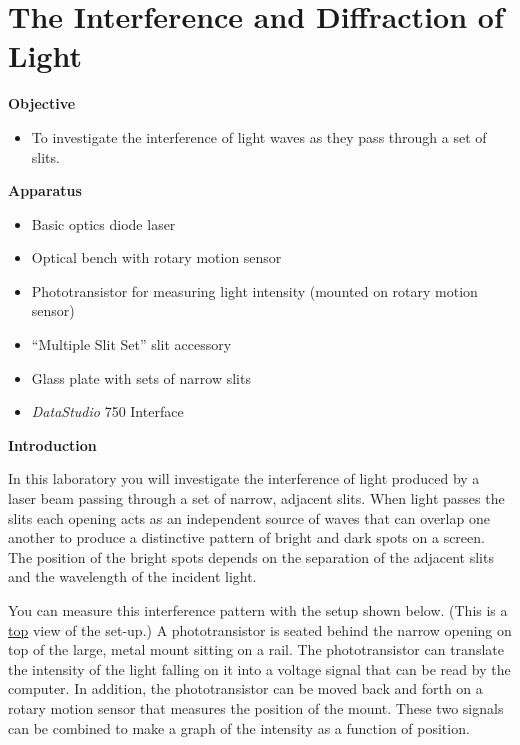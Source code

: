 
\section{The Interference and Diffraction of Light}

\makelabheader %

\textbf{Objective}

\begin{itemize}
\item To investigate the interference of light waves as they pass through
a set of slits. 
\end{itemize}
\textbf{Apparatus}

\begin{itemize}
\item Basic optics diode laser
\item Optical bench with rotary motion sensor
\item Phototransistor for measuring light intensity (mounted on rotary motion sensor)
\item ``Multiple Slit Set'' slit accessory
\item Glass plate with sets of narrow slits
\item {\it DataStudio} 750 Interface
\end{itemize}
\textbf{Introduction}

In this laboratory you will investigate the interference of light
produced by a laser beam passing through a set of narrow, adjacent
slits. When light passes the slits each opening acts as an independent
source of waves that can overlap one another to produce a distinctive
pattern of bright and dark spots on a screen. The position of the
bright spots depends on the separation of the adjacent slits and the
wavelength of the incident light. 

You can measure this interference pattern with the setup shown below. 
(This is a \underline{top} view of the set-up.) 
A phototransistor is seated behind the narrow opening on top of the large,
metal mount sitting on a rail. The phototransistor can translate the intensity 
of the light falling on it into a voltage signal that can be read by the
computer. In addition, the phototransistor can be moved back and
forth on a rotary motion sensor that measures the position of the 
mount. These two signals can be combined to
make a graph of the intensity as a function of position.

\vspace{0.3cm}
{\centering {} \par}
\vspace{0.3cm}

